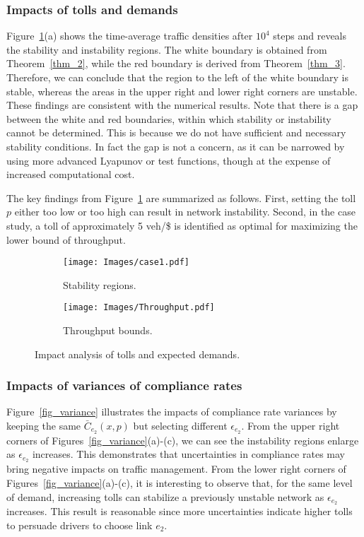 \subsubsection{Impacts of tolls and demands}
Figure~\ref{fig_demand_pricing}(a) shows the time-average traffic densities after $10^4$ steps and reveals the stability and instability regions. The white boundary is obtained from Theorem~\ref{thm_2}, while the red boundary is derived from Theorem~\ref{thm_3}. Therefore, we can conclude that the region to the left of the white boundary is stable, whereas the areas in the upper right and lower right corners are unstable. These findings are consistent with the numerical results. Note that there is a gap between the white and red boundaries, within which stability or instability cannot be determined. This is because we do not have sufficient and necessary stability conditions. In fact the gap is not a concern, as it can be narrowed by using more advanced Lyapunov or test functions, though at the expense of increased computational cost. 

The key findings from Figure~\ref{fig_demand_pricing} are summarized as follows. First, setting the toll $p$  either too low or too high can result in network instability. Second, in the case study, a toll of approximately 5 veh/\$ is identified as optimal for maximizing the lower bound of throughput.

\begin{figure}[htbp]
    \centering
    \begin{subfigure}{0.25\linewidth}
        \centering
        \texttt{[image: Images/case1.pdf]}
    \caption{Stability regions.}
    \end{subfigure}
    \begin{subfigure}{0.25\linewidth}
        \centering
        \texttt{[image: Images/Throughput.pdf]}
    \caption{Throughput bounds.}
    \end{subfigure}

    \caption{Impact analysis of tolls and expected demands.}
    \label{fig_demand_pricing}
\end{figure}



\subsubsection{Impacts of variances of compliance rates}
Figure~\ref{fig_variance} illustrates the impacts of compliance rate variances by keeping the same $\bar{C}_{e_2}(x,p)$ but  selecting different $\epsilon_{e_2}$. From the upper right corners of Figures~\ref{fig_variance}(a)-(c), we can see the instability regions enlarge as $\epsilon_{e_2}$ increases. This  demonstrates that uncertainties in compliance rates may bring negative impacts on traffic management. From the lower right corners of Figures~\ref{fig_variance}(a)-(c), it is interesting to observe that, for the same level of demand, increasing tolls can stabilize a previously unstable network as $\epsilon_{e_2}$ increases. This result is reasonable since more uncertainties indicate higher tolls to persuade drivers to choose link $e_2$. 

